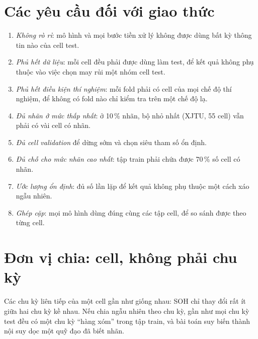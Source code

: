 \documentclass[12pt,a4paper,oneside]{report}
\theoremstyle{plain}
\theoremstyle{definition}
\begin{document}
\section{Các yêu cầu đối với giao thức}

\begin{enumerate}[label=\textbf{Y\arabic*.}]
\item \emph{Không rò rỉ}: mô hình và mọi bước tiền xử lý không được dùng bất kỳ thông tin nào của cell test.
\item \emph{Phủ hết dữ liệu}: mỗi cell đều phải được dùng làm test, để kết quả không phụ thuộc vào việc chọn may
      rủi một nhóm cell test.
\item \emph{Phủ hết điều kiện thí nghiệm}: mỗi fold phải có cell của mọi chế độ thí nghiệm, để không có fold
      nào chỉ kiểm tra trên một chế độ lạ.
\item \emph{Đủ nhãn ở mức thấp nhất}: ở 10\,\% nhãn, bộ nhỏ nhất (XJTU, 55 cell) vẫn phải có vài cell có nhãn.
\item \emph{Đủ cell validation} để dừng sớm và chọn siêu tham số ổn định.
\item \emph{Đủ chỗ cho mức nhãn cao nhất}: tập train phải chứa được 70\,\% số cell có nhãn.
\item \emph{Ước lượng ổn định}: đủ số lần lặp để kết quả không phụ thuộc một cách xáo ngẫu nhiên.
\item \emph{Ghép cặp}: mọi mô hình dùng đúng cùng các tập cell, để so sánh được theo từng cell.
\end{enumerate}

\section{Đơn vị chia: cell, không phải chu kỳ}\label{sec:unit}

Các chu kỳ liên tiếp của một cell gần như giống nhau: SOH chỉ thay đổi rất ít giữa hai chu kỳ kề nhau. Nếu chia
ngẫu nhiên theo chu kỳ, gần như mọi chu kỳ test đều có một chu kỳ “hàng xóm” trong tập train, và bài toán
suy biến thành nội suy dọc một quỹ đạo đã biết nhãn.
\end{document}
